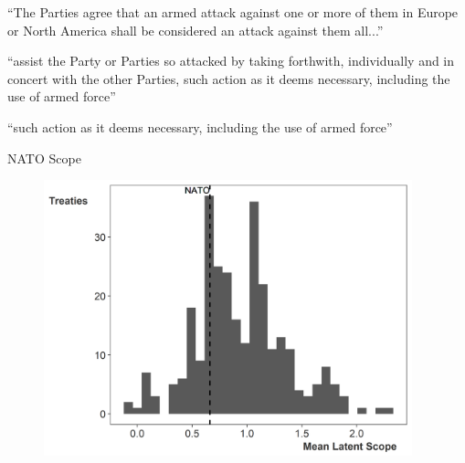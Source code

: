 \documentclass{beamer}
\begin{document}

\begin{frame}[standout]

\large ``The Parties agree that an armed attack against one or more of them in Europe or North America shall be considered an attack against them all...'' 

 \end{frame}


\begin{frame}[standout]

\large ``assist the Party or Parties so attacked by taking forthwith, individually and in concert with the other Parties, such action as it deems necessary, including the use of armed force'' 

 \end{frame}


\begin{frame}[standout]

\huge ``such action as it deems necessary, including the use of armed force'' 

 \end{frame}


\begin{frame}{NATO Scope} 

\begin{figure}
	\centering
		\includegraphics[width=0.95\textwidth]{ls-hist-nato.png}
\end{figure}


 \end{frame}
\end{document}
